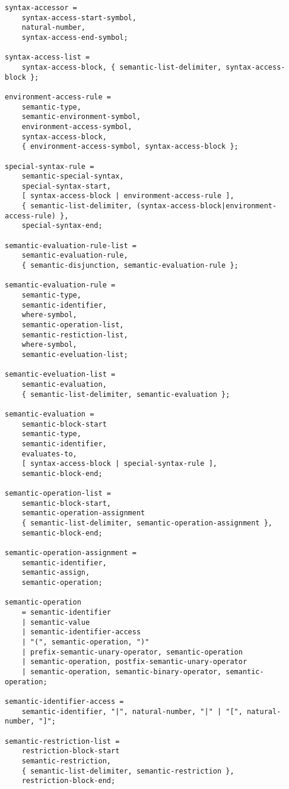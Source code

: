 \begin{verbatim}
syntax-accessor = 
    syntax-access-start-symbol,
    natural-number,
    syntax-access-end-symbol;

syntax-access-list = 
    syntax-access-block, { semantic-list-delimiter, syntax-access-block };

environment-access-rule = 
    semantic-type,
    semantic-environment-symbol,
    environment-access-symbol,
    syntax-access-block,
    { environment-access-symbol, syntax-access-block };

special-syntax-rule = 
    semantic-special-syntax,
    special-syntax-start,
    [ syntax-access-block | environment-access-rule ],
    { semantic-list-delimiter, (syntax-access-block|environment-access-rule) },
    special-syntax-end;

semantic-evaluation-rule-list = 
    semantic-evaluation-rule,
    { semantic-disjunction, semantic-evaluation-rule };

semantic-evaluation-rule = 
    semantic-type,
    semantic-identifier,
    where-symbol,
    semantic-operation-list,
    semantic-restiction-list,
    where-symbol, 
    semantic-eveluation-list;

semantic-eveluation-list = 
    semantic-evaluation,
    { semantic-list-delimiter, semantic-evaluation };

semantic-evaluation = 
    semantic-block-start
    semantic-type, 
    semantic-identifier,
    evaluates-to,
    [ syntax-access-block | special-syntax-rule ],
    semantic-block-end;

semantic-operation-list = 
    semantic-block-start,
    semantic-operation-assignment
    { semantic-list-delimiter, semantic-operation-assignment },
    semantic-block-end;

semantic-operation-assignment =
    semantic-identifier,
    semantic-assign,
    semantic-operation;

semantic-operation 
    = semantic-identifier
    | semantic-value
    | semantic-identifier-access
    | "(", semantic-operation, ")"
    | prefix-semantic-unary-operator, semantic-operation
    | semantic-operation, postfix-semantic-unary-operator
    | semantic-operation, semantic-binary-operator, semantic-operation;

semantic-identifier-access = 
    semantic-identifier, "|", natural-number, "|" | "[", natural-number, "]";

semantic-restriction-list = 
    restriction-block-start
    semantic-restriction,
    { semantic-list-delimiter, semantic-restriction },
    restriction-block-end;


\end{verbatim}
